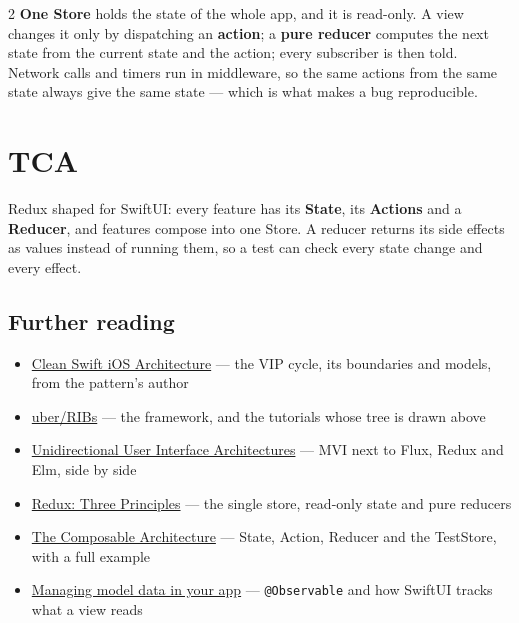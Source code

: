 \documentclass[8pt]{extarticle}
\begin{document}
\begin{multicols}{2}
\textbf{One Store} holds the state of the whole app, and it is read-only. A view changes it only
by dispatching an \textbf{action}; a \textbf{pure reducer} computes the next state from the
current state and the action; every subscriber is then told. Network calls and timers run in
middleware, so the same actions from the same state always give the same state — which is what
makes a bug reproducible.
\begin{itemize}
\end{itemize}

\section{TCA}
Redux shaped for SwiftUI: every feature has its \textbf{State}, its \textbf{Actions} and a
\textbf{Reducer}, and features compose into one Store. A reducer returns its side effects as
values instead of running them, so a test can check every state change and every effect.

\begin{htmlonly}
\section{Further reading}
\begin{itemize}
  \item \href{https://clean-swift.com/clean-swift-ios-architecture/}{Clean Swift iOS Architecture} — the VIP cycle, its boundaries and models, from the pattern's author
  \item \href{https://github.com/uber/RIBs}{uber/RIBs} — the framework, and the tutorials whose tree is drawn above
  \item \href{https://staltz.com/unidirectional-user-interface-architectures.html}{Unidirectional User Interface Architectures} — MVI next to Flux, Redux and Elm, side by side
  \item \href{https://redux.js.org/understanding/thinking-in-redux/three-principles}{Redux: Three Principles} — the single store, read-only state and pure reducers
  \item \href{https://github.com/pointfreeco/swift-composable-architecture}{The Composable Architecture} — State, Action, Reducer and the TestStore, with a full example
  \item \href{https://developer.apple.com/documentation/swiftui/managing-model-data-in-your-app}{Managing model data in your app} — \texttt{@Observable} and how SwiftUI tracks what a view reads
\end{itemize}
\end{htmlonly}

\end{multicols}

\end{document}
